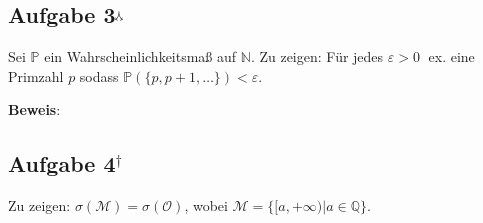 \documentclass[11pt,a4paper,ngerman]{article}
\newcommand{\set}[1]{ \{ #1 \}}
\newcommand{\Prob}{\mathbb{P}}
\begin{document}
\subsection*{Aufgabe 3$^\curlywedgedownarrow$}
Sei $\Prob$ ein Wahrscheinlichkeitsmaß auf $\mathbb{N}$. Zu zeigen: Für jedes $\varepsilon > 0 \; $ ex. eine Primzahl $p$ sodass $\Prob(\set{p,p+1,\ldots}) < \varepsilon$.

\textbf{Beweis}: \\



\subsection*{Aufgabe 4$^\dagger$}
Zu zeigen: $\sigma(\mathcal{M}) = \sigma(\mathcal{O})$, wobei $\mathcal{M} = \set{[a, +\infty) | a \in \mathbb{Q}}$.



\label{LastPage}
\end{document}
